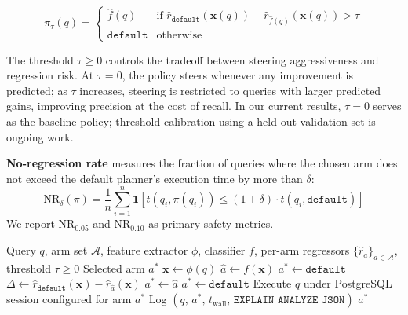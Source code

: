 \documentclass[sigconf,natbib=false]{article}
\newcommand{\postgres}{PostgreSQL}
\newcommand{\sys}{\textsc{RiskSteer}}
\newcommand{\threshold}{\tau}
\newcommand{\policy}{\pi}
\begin{document}
\begin{equation}
  \label{eq:policy}
  \policy_\threshold(q) = \begin{cases}
    \hat{f}(q) & \text{if } \hat{r}_{\texttt{default}}(\mathbf{x}(q)) - \hat{r}_{\hat{f}(q)}(\mathbf{x}(q)) > \threshold \\
    \texttt{default} & \text{otherwise}
  \end{cases}
\end{equation}

The threshold $\threshold \geq 0$ controls the tradeoff between steering aggressiveness and
regression risk. At $\threshold = 0$, the policy steers whenever any improvement is predicted;
as $\threshold$ increases, steering is restricted to queries with larger predicted gains,
improving precision at the cost of recall. In our current results, $\threshold = 0$ serves as
the baseline policy; threshold calibration using a held-out validation set is ongoing work.

\textbf{No-regression rate} measures the fraction of queries where the chosen arm does not
exceed the default planner's execution time by more than $\delta$:
\[
  \mathrm{NR}_\delta(\policy) = \frac{1}{n}\sum_{i=1}^n \mathbf{1}\!\left[t(q_i, \policy(q_i)) \leq (1+\delta) \cdot t(q_i, \texttt{default})\right]
\]
We report $\mathrm{NR}_{0.05}$ and $\mathrm{NR}_{0.10}$ as primary safety metrics.

\begin{algorithm}[t]
\caption{Risk-Controlled Planner Arm Selection (\sys{})}
\label{alg:steering}
\begin{algorithmic}[1]
\Require Query $q$, arm set $\mathcal{A}$, feature extractor $\phi$, classifier $f$, per-arm regressors $\{\hat{r}_a\}_{a \in \mathcal{A}}$, threshold $\threshold \geq 0$
\Ensure Selected arm $a^*$
\State $\mathbf{x} \gets \phi(q)$ 
\State $\hat{a} \gets f(\mathbf{x})$ 
  \State $a^* \gets \texttt{default}$ 
\Else
  \State $\Delta \gets \hat{r}_{\texttt{default}}(\mathbf{x}) - \hat{r}_{\hat{a}}(\mathbf{x})$ 
  \If{$\Delta > \threshold$}
    \State $a^* \gets \hat{a}$ 
  \Else
    \State $a^* \gets \texttt{default}$ 
  \EndIf
\EndIf
\State Execute $q$ under \postgres{} session configured for arm $a^*$
\State Log $(q,\, a^*,\, t_{\mathrm{wall}},\, \texttt{EXPLAIN ANALYZE JSON})$
\State \Return $a^*$
\end{algorithmic}
\end{algorithm}
\end{document}
